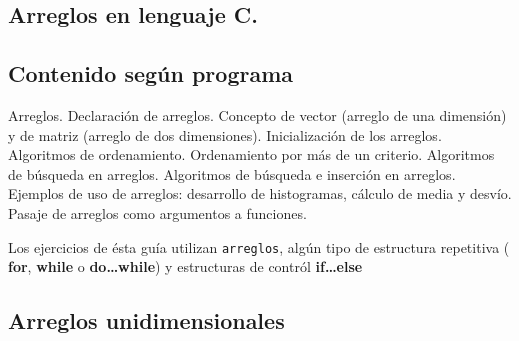 \setcounter{subsection}{7}
\subsection*{Arreglos en lenguaje C.}
\subsection*{Contenido según programa}
Arreglos. Declaración de arreglos. Concepto de vector (arreglo de una dimensión) y de matriz (arreglo de dos dimensiones). Inicialización de los arreglos.  Algoritmos de ordenamiento. Ordenamiento por más de un criterio. Algoritmos de búsqueda en arreglos. Algoritmos de búsqueda e inserción en arreglos. Ejemplos de uso de arreglos: desarrollo de histogramas, cálculo de media y desvío. Pasaje de arreglos como argumentos a funciones.

Los ejercicios de ésta guía utilizan \texttt{arreglos}, algún tipo de estructura repetitiva ( \textbf{for}, \textbf{while} o \textbf{do\dots while}) y estructuras de contról \textbf{if\dots else}

\setcounter{subsection}{7}
\subsection*{Arreglos unidimensionales}

